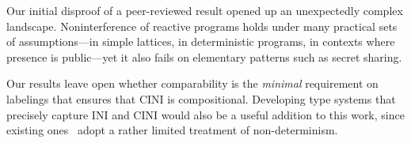 \documentclass[preprint,5p,twocolumn]{elsarticle}
\begin{document}
Our initial disproof of a peer-reviewed result opened up an unexpectedly complex landscape.
Noninterference of reactive programs holds under many practical sets of assumptions---in
simple lattices, in deterministic programs, in contexts where presence is public---yet
it also fails on elementary patterns such as secret sharing.

Our results leave open whether comparability is the \emph{minimal} requirement on labelings that
ensures that CINI is compositional. Developing type systems that precisely capture INI and CINI
would also be a useful addition to this work, since existing
ones~\cite{Rafnsson2012} adopt a rather limited treatment of non-determinism.


  
 





\end{document}

